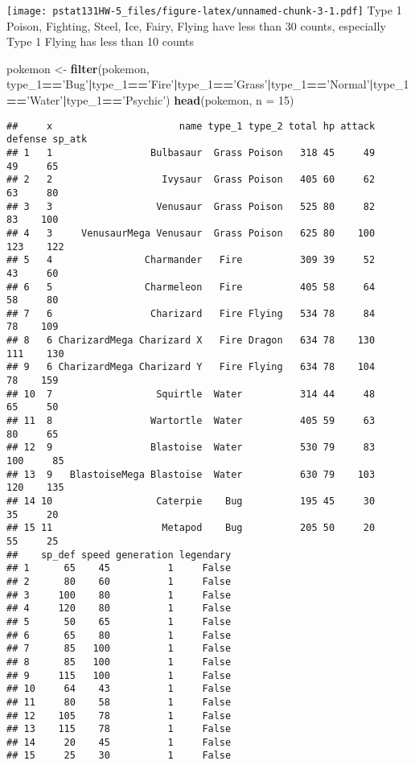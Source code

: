 \documentclass[]{article}
\newenvironment{Shaded}{\begin{snugshade}}{\end{snugshade}}
\newcommand{\DataTypeTok}[1]{\textcolor[rgb]{0.13,0.29,0.53}{#1}}
\newcommand{\DecValTok}[1]{\textcolor[rgb]{0.00,0.00,0.81}{#1}}
\newcommand{\KeywordTok}[1]{\textcolor[rgb]{0.13,0.29,0.53}{\textbf{#1}}}
\newcommand{\NormalTok}[1]{#1}
\newcommand{\OperatorTok}[1]{\textcolor[rgb]{0.81,0.36,0.00}{\textbf{#1}}}
\newcommand{\StringTok}[1]{\textcolor[rgb]{0.31,0.60,0.02}{#1}}
\begin{document}
\texttt{[image: pstat131HW-5\_files/figure-latex/unnamed-chunk-3-1.pdf]}
Type 1 Poison, Fighting, Steel, Ice, Fairy, Flying have less than 30
counts, especially Type 1 Flying has less than 10 counts

\begin{Shaded}
\begin{Highlighting}[]
\NormalTok{pokemon <-}\StringTok{ }\KeywordTok{filter}\NormalTok{(pokemon, type_}\DecValTok{1}\OperatorTok{==}\StringTok{'Bug'}\OperatorTok{|}\NormalTok{type_}\DecValTok{1}\OperatorTok{==}\StringTok{'Fire'}\OperatorTok{|}\NormalTok{type_}\DecValTok{1}\OperatorTok{==}\StringTok{'Grass'}\OperatorTok{|}\NormalTok{type_}\DecValTok{1}\OperatorTok{==}\StringTok{'Normal'}\OperatorTok{|}\NormalTok{type_}\DecValTok{1}\OperatorTok{==}\StringTok{'Water'}\OperatorTok{|}\NormalTok{type_}\DecValTok{1}\OperatorTok{==}\StringTok{'Psychic'}\NormalTok{)}
\KeywordTok{head}\NormalTok{(pokemon, }\DataTypeTok{n =} \DecValTok{15}\NormalTok{)}
\end{Highlighting}
\end{Shaded}

\begin{verbatim}
##     x                      name type_1 type_2 total hp attack defense sp_atk
## 1   1                 Bulbasaur  Grass Poison   318 45     49      49     65
## 2   2                   Ivysaur  Grass Poison   405 60     62      63     80
## 3   3                  Venusaur  Grass Poison   525 80     82      83    100
## 4   3     VenusaurMega Venusaur  Grass Poison   625 80    100     123    122
## 5   4                Charmander   Fire          309 39     52      43     60
## 6   5                Charmeleon   Fire          405 58     64      58     80
## 7   6                 Charizard   Fire Flying   534 78     84      78    109
## 8   6 CharizardMega Charizard X   Fire Dragon   634 78    130     111    130
## 9   6 CharizardMega Charizard Y   Fire Flying   634 78    104      78    159
## 10  7                  Squirtle  Water          314 44     48      65     50
## 11  8                 Wartortle  Water          405 59     63      80     65
## 12  9                 Blastoise  Water          530 79     83     100     85
## 13  9   BlastoiseMega Blastoise  Water          630 79    103     120    135
## 14 10                  Caterpie    Bug          195 45     30      35     20
## 15 11                   Metapod    Bug          205 50     20      55     25
##    sp_def speed generation legendary
## 1      65    45          1     False
## 2      80    60          1     False
## 3     100    80          1     False
## 4     120    80          1     False
## 5      50    65          1     False
## 6      65    80          1     False
## 7      85   100          1     False
## 8      85   100          1     False
## 9     115   100          1     False
## 10     64    43          1     False
## 11     80    58          1     False
## 12    105    78          1     False
## 13    115    78          1     False
## 14     20    45          1     False
## 15     25    30          1     False
\end{verbatim}
\end{document}
